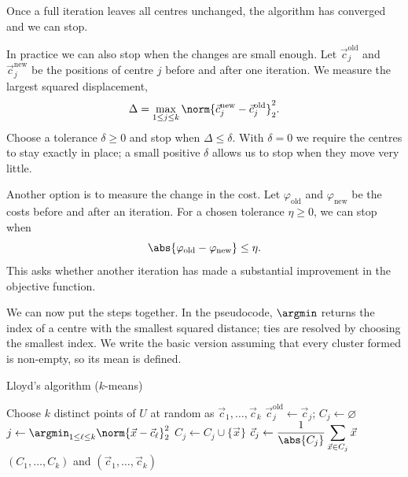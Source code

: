 \documentclass[a4paper,12pt,oneside]{report}
\begin{document}
Once a full iteration leaves all centres unchanged, the algorithm has
converged and we can stop.

In practice we can also stop when the changes are small enough.
Let $\vec c_j^{\mathrm{old}}$ and $\vec c_j^{\mathrm{new}}$ be the
positions of centre $j$ before and after one iteration. We measure the
largest squared displacement,
\[
  \Delta=\max_{1\leq j\leq k}
  \norm{\vec c_j^{\mathrm{new}}-\vec c_j^{\mathrm{old}}}_2^2.
\]
Choose a tolerance $\delta\geq0$ and stop when $\Delta\leq\delta$.
With $\delta=0$ we require the centres to stay exactly in place; a
small positive $\delta$ allows us to stop when they move very little.

Another option is to measure the change in the cost. Let
$\varphi_{\mathrm{old}}$ and $\varphi_{\mathrm{new}}$ be the costs
before and after an iteration. For a chosen tolerance $\eta\geq0$,
we can stop when
\[
  \abs{\varphi_{\mathrm{old}}-\varphi_{\mathrm{new}}}\leq\eta.
\]
This asks whether another iteration has made a substantial improvement
in the objective function.

We can now put the steps together. In the pseudocode, $\argmin$
returns the index of a centre with the smallest squared distance;
ties are resolved by choosing the smallest index. We write the basic
version assuming that every cluster formed is non-empty, so its mean
is defined.

\begin{framedalgo}{Lloyd's algorithm ($k$-means)}\label{alg:lloyd}
\begin{algorithmic}[1]
    \State Choose $k$ distinct points of $U$ at random as
      $\vec c_1,\ldots,\vec c_k$
    \Repeat
        \State $\vec c_j^{\mathrm{old}}\gets\vec c_j$;
          $C_j\gets\varnothing$
      \EndFor
        \State $j\gets\argmin_{1\leq\ell\leq k}
          \norm{\vec x-\vec c_\ell}_2^2$
        \State $C_j\gets C_j\cup\{\vec x\}$
      \EndFor
        \State $\vec c_j\gets\dfrac{1}{\abs{C_j}}
          \displaystyle\sum_{\vec x\in C_j}\vec x$
      \EndFor
    \State \Return $(C_1,\ldots,C_k)$ and
      $(\vec c_1,\ldots,\vec c_k)$
  \EndFunction
\end{algorithmic}
\end{framedalgo}
\end{document}
